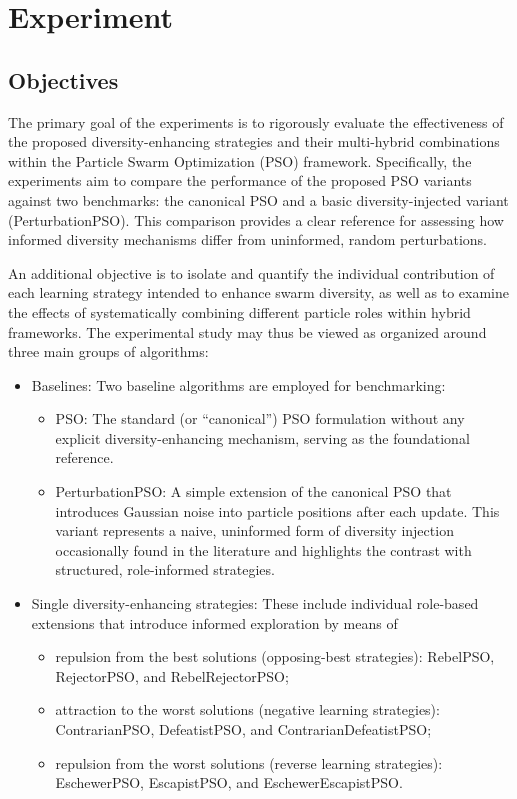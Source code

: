 \chapter[Experiment]{Experiment}
\label{cp:experiment}

{


\section{Objectives}


The primary goal of the experiments is to rigorously evaluate the effectiveness of the proposed diversity-enhancing strategies and their multi-hybrid combinations within the Particle Swarm Optimization (PSO) framework. Specifically, the experiments aim to compare the performance of the proposed PSO variants against two benchmarks: the canonical PSO and a basic diversity-injected variant (PerturbationPSO). This comparison provides a clear reference for assessing how informed diversity mechanisms differ from uninformed, random perturbations.

An additional objective is to isolate and quantify the individual contribution of each learning strategy intended to enhance swarm diversity, as well as to examine the effects of systematically combining different particle roles within hybrid frameworks.
The experimental study may thus be viewed as organized around three main groups of algorithms:
\begin{itemize}
    \item Baselines:
  Two baseline algorithms are employed for benchmarking:
    \begin{itemize}
        \item PSO: The standard (or ``canonical'') PSO formulation without any explicit diversity-enhancing mechanism, serving as the foundational reference.
        
        \item PerturbationPSO: A simple extension of the canonical PSO that introduces Gaussian noise into particle positions after each update. This variant represents a naive, uninformed form of diversity injection occasionally found in the literature and highlights the contrast with structured, role-informed strategies.
    \end{itemize}
    
    \item Single diversity-enhancing strategies:
    These include individual role-based extensions that introduce informed exploration by means of
    \begin{itemize}
        \item repulsion from the best solutions (opposing-best strategies): RebelPSO, RejectorPSO, and RebelRejectorPSO;
        \item attraction to the worst solutions (negative learning strategies): ContrarianPSO, DefeatistPSO, and ContrarianDefeatistPSO;
        \item repulsion from the worst solutions (reverse learning strategies): EschewerPSO, EscapistPSO, and EschewerEscapistPSO.
    \end{itemize}
    

\end{itemize}}
